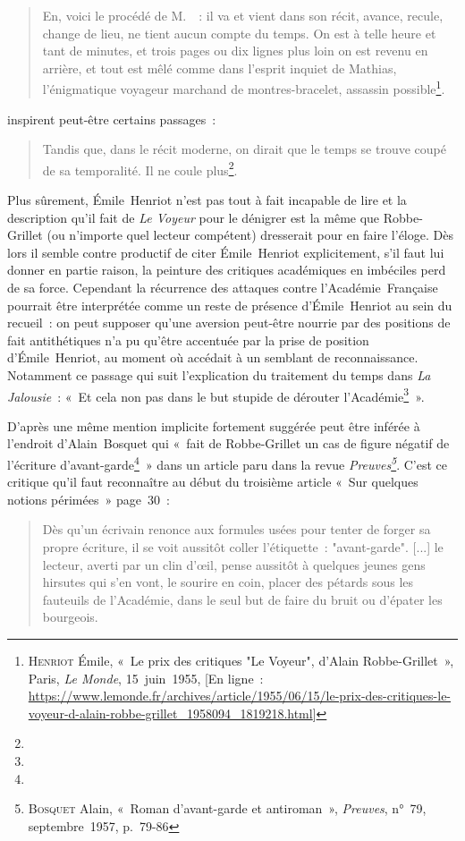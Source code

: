 \documentclass[12pt, a4paper]{article}
\begin{document}
\begin{quote}
    En, voici le procédé de M.~\robbe~: il va et vient dans son récit, avance, recule, change de lieu, ne tient aucun compte du temps. On est à telle heure et tant de minutes, et trois pages ou dix lignes plus loin on est revenu en arrière, et tout est mêlé comme dans l'esprit inquiet de Mathias, l'énigmatique voyageur marchand de montres-bracelet, assassin possible\footnote{\op\textsc{Henriot} Émile, «~Le prix des critiques "Le Voyeur", d'Alain Robbe-Grillet~», Paris, \textit{Le Monde}, 15~juin~1955, [En ligne~: \href{https://www.lemonde.fr/archives/article/1955/06/15/le-prix-des-critiques-le-voyeur-d-alain-robbe-grillet_1958094_1819218.html}{https://www.lemonde.fr/archives/article/1955/06/15/le-prix-des-critiques-le-voyeur-d-alain-robbe-grillet\_1958094\_1819218.html}]}.
\end{quote}
inspirent peut-être certains passages~:
\begin{quote}
    Tandis que, dans le récit moderne, on dirait que le temps se trouve coupé de sa temporalité. Il ne coule plus\footnote{}.
\end{quote}
Plus sûrement, Émile~Henriot n'est pas tout à fait incapable de lire et la description qu'il fait de \textit{Le Voyeur} pour le dénigrer est la même que Robbe-Grillet (ou n'importe quel lecteur compétent) dresserait pour en faire l'éloge. Dès lors il semble contre productif de citer Émile~Henriot explicitement, s'il faut lui donner en partie raison, la peinture des critiques académiques en imbéciles perd de sa force. Cependant la récurrence des attaques contre l'Académie~Française pourrait être interprétée comme un reste de présence d'Émile~Henriot au sein du recueil~: on peut supposer qu'une aversion peut-être nourrie par des positions de fait antithétiques n'a pu qu'être accentuée par la prise de position d'Émile~Henriot, au moment où \robbe{} accédait à un semblant de reconnaissance. Notamment ce passage qui suit l'explication du traitement du temps dans \textit{La Jalousie}~: «~Et cela non pas dans le but stupide de dérouter l'Académie\footnote{}~».

D'après \galia{} une même mention implicite fortement suggérée peut être inférée à l'endroit d'Alain~Bosquet qui «~fait de Robbe-Grillet un cas de figure négatif de l’écriture d’avant-garde\footnote{}~» dans un article paru dans la revue \textit{Preuves\footnote{\textsc{Bosquet} Alain, «~Roman d’avant-garde et antiroman~», \textit{Preuves}, n°~79, septembre~1957, p.~79-86}}. C'est ce critique qu'il faut reconnaître au début du troisième article «~Sur quelques notions périmées~» page~30~:
\begin{quote}
    Dès qu'un écrivain renonce aux formules usées pour tenter de forger sa propre écriture, il se voit aussitôt coller l'étiquette~: "avant-garde". [...] le lecteur, averti par un clin d'œil, pense aussitôt à quelques jeunes gens hirsutes qui s'en vont, le sourire en coin, placer des pétards sous les fauteuils de l'Académie, dans le seul but de faire du bruit ou d'épater les bourgeois.
\end{quote}
\end{document}
